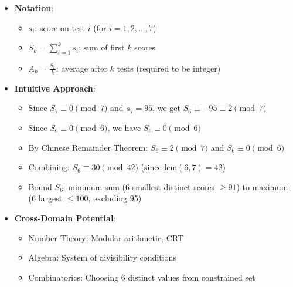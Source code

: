 \documentclass[11pt]{article}
\begin{document}
\begin{problemconfigbox}
\begin{itemize}[leftmargin=*]
    \item \textbf{Notation}: 
    \begin{itemize}
        \item $s_i$: score on test $i$ (for $i = 1, 2, \ldots, 7$)
        \item $S_k = \sum_{i=1}^{k} s_i$: sum of first $k$ scores
        \item $A_k = \frac{S_k}{k}$: average after $k$ tests (required to be integer)
    \end{itemize}
    
    \item \textbf{Intuitive Approach}: 
    \begin{itemize}
        \item Since $S_7 \equiv 0 \pmod{7}$ and $s_7 = 95$, we get $S_6 \equiv -95 \equiv 2 \pmod{7}$
        \item Since $S_6 \equiv 0 \pmod{6}$, we have $S_6 \equiv 0 \pmod{6}$
        \item By Chinese Remainder Theorem: $S_6 \equiv 2 \pmod{7}$ and $S_6 \equiv 0 \pmod{6}$
        \item Combining: $S_6 \equiv 30 \pmod{42}$ (since $\text{lcm}(6,7) = 42$)
        \item Bound $S_6$: minimum sum (6 smallest distinct scores $\geq 91$) to maximum (6 largest $\leq 100$, excluding 95)
    \end{itemize}
    
    \item \textbf{Cross-Domain Potential}: 
    \begin{itemize}
        \item Number Theory: Modular arithmetic, CRT
        \item Algebra: System of divisibility conditions
        \item Combinatorics: Choosing 6 distinct values from constrained set
    \end{itemize}
\end{itemize}
\end{problemconfigbox}
\end{document}
